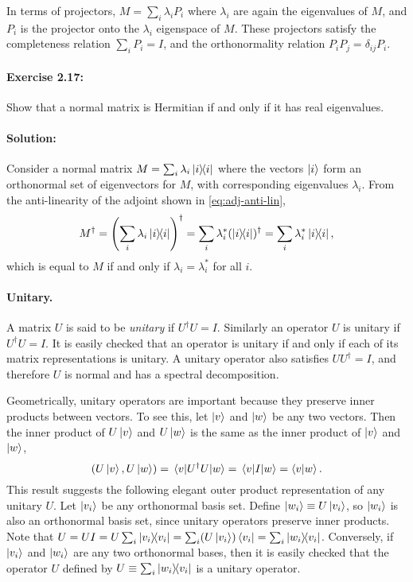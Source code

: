 In terms of projectors, $M = \sum_i \lambda_i P_i$ where $\lambda_i$ are again
the eigenvalues of $M$, and $P_i$ is the projector onto the $\lambda_i$
eigenspace of $M$. These projectors satisfy the completeness relation $\sum_i
P_i = I$, and the orthonormality relation $P_iP_j = \delta_{ij}P_i$.

\paragraph{Exercise 2.17:} Show that a normal matrix is Hermitian if and only
if it has real eigenvalues.

\paragraph{Solution:} Consider a normal matrix $M = \sum_i \lambda_i
\ketbra{i}{i}$ where the vectors $\ket{i}$ form an orthonormal set of
eigenvectors for $M$, with corresponding eigenvalues $\lambda_i$. From the
anti-linearity of the adjoint shown in \eqref{eq:adj-anti-lin},
\begin{equation*}
  M^\dagger = \left(\sum_i \lambda_i \ketbra{i}{i}\right)^\dagger = \sum_i
  \lambda_i^* (\ketbra{i}{i})^\dagger = \sum_i \lambda_i^* \ketbra{i}{i},
\end{equation*} which is equal to $M$ if and only if $\lambda_i = \lambda_i^*$
for all $i$.

\paragraph{Unitary.} A matrix $U$ is said to be \emph{unitary} if $U^\dagger U
= I$. Similarly an operator $U$ is unitary if $U^\dagger U = I$. It is easily
checked that an operator is unitary if and only if each of its matrix
representations is unitary. A unitary operator also satisfies $U U^\dagger =
I$, and therefore $U$ is normal and has a spectral decomposition.

Geometrically, unitary operators are important because they preserve inner
products between vectors. To see this, let $\ket{v}$ and $\ket{w}$ be any two
vectors. Then the inner product of $U\ket{v}$ and $U\ket{w}$ is the same as the
inner product of $\ket{v}$ and $\ket{w}$, \begin{equation*}
  (U\ket{v}, U\ket{w}) = \mel{v}{U^\dagger U}{w} = \mel{v}{I}{w} =
    \braket{v}{w}.
\end{equation*} This result suggests the following elegant outer product
representation of any unitary $U$. Let $\ket{v_i}$ be any orthonormal basis
set. Define $\ket{w_i} \equiv U\ket{v_i}$, so $\ket{w_i}$ is also an
orthonormal basis set, since unitary operators preserve inner products. Note
that $U = UI = U\sum_i \ketbra{v_i}{v_i} = \sum_i (U\ket{v_i})\bra{v_i} =
\sum_i \ketbra{w_i}{v_i}$. Conversely, if $\ket{v_i}$ and $\ket{w_i}$ are any
two orthonormal bases, then it is easily checked that the operator $U$ defined
by $U \equiv \sum_i \ketbra{w_i}{v_i}$ is a unitary operator.

